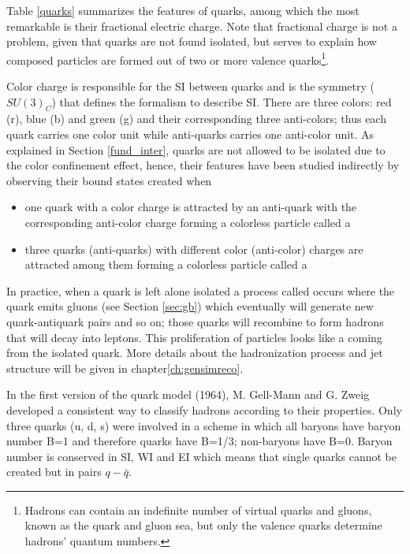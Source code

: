 Table \ref{quarks} summarizes the features of quarks, among which the most remarkable is their fractional electric charge. Note that fractional charge is not a problem, given that quarks are not found isolated, but serves to explain how composed particles are formed out of two or more valence quarks\footnote{Hadrons can contain an indefinite number of virtual quarks and gluons, known as the quark and gluon sea, but only the valence quarks determine hadrons' quantum numbers.}.

Color charge is responsible for the SI between quarks and is the symmetry ($SU(3)_C$) that defines the formalism to describe SI. There are three colors: red (r), blue (b) and green (g) and their corresponding three anti-colors; thus each quark carries one color unit while anti-quarks carries one anti-color unit. As explained in Section \ref{fund_inter}, quarks are not allowed to be isolated due to the color confinement effect, hence, their features have been studied indirectly by observing their bound states created when

\begin{itemize}
\item one quark with a color charge is attracted by an anti-quark with the corresponding anti-color charge forming a colorless particle called a 
\item three quarks (anti-quarks) with different color (anti-color) charges are attracted among them forming a colorless particle called a           
\end{itemize}

In practice, when a quark is left alone isolated a process called  occurs where the quark emits gluons (see Section \ref{sec:gb}) which eventually will generate new quark-antiquark pairs and so on; those quarks will recombine to form hadrons that will decay into leptons. This proliferation of particles looks like a  coming from the isolated quark. More details about the hadronization process and jet structure will be given in chapter\ref{ch:gensimreco}.         

In the first version of the quark model (1964), M. Gell-Mann\cite{gellman} and G. Zweig\cite{zweig,zweig2} developed a consistent way to classify hadrons according to their properties. Only three quarks (u, d, s) were involved in a scheme in which all baryons have baryon number B=1 and therefore quarks have B=1/3; non-baryons have B=0. Baryon number is conserved in SI, WI and EI which means that single quarks cannot be created but in pairs $q-\bar{q}$.

